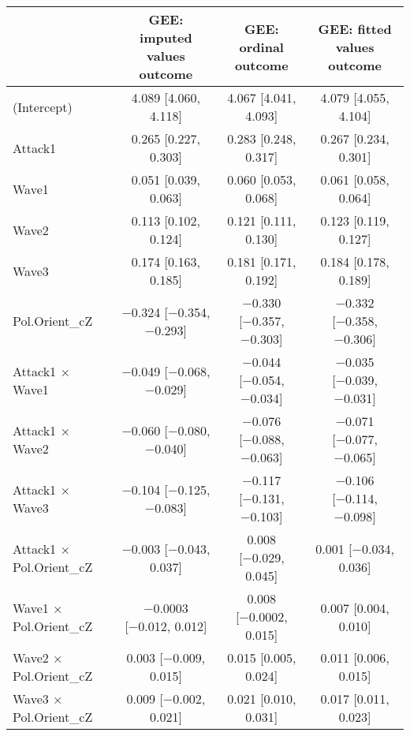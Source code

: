\begin{table}
\centering
\begin{tabular}[t]{lccc}
\toprule
  & GEE: imputed values outcome & GEE: ordinal outcome & GEE: fitted values outcome\\
\midrule
(Intercept) & \num{4.089} [\num{4.060}, \num{4.118}] & \num{4.067} [\num{4.041}, \num{4.093}] & \num{4.079} [\num{4.055}, \num{4.104}]\\
Attack1 & \num{0.265} [\num{0.227}, \num{0.303}] & \num{0.283} [\num{0.248}, \num{0.317}] & \num{0.267} [\num{0.234}, \num{0.301}]\\
Wave1 & \num{0.051} [\num{0.039}, \num{0.063}] & \num{0.060} [\num{0.053}, \num{0.068}] & \num{0.061} [\num{0.058}, \num{0.064}]\\
Wave2 & \num{0.113} [\num{0.102}, \num{0.124}] & \num{0.121} [\num{0.111}, \num{0.130}] & \num{0.123} [\num{0.119}, \num{0.127}]\\
Wave3 & \num{0.174} [\num{0.163}, \num{0.185}] & \num{0.181} [\num{0.171}, \num{0.192}] & \num{0.184} [\num{0.178}, \num{0.189}]\\
Pol.Orient\_cZ & \num{-0.324} [\num{-0.354}, \num{-0.293}] & \num{-0.330} [\num{-0.357}, \num{-0.303}] & \num{-0.332} [\num{-0.358}, \num{-0.306}]\\
Attack1 × Wave1 & \num{-0.049} [\num{-0.068}, \num{-0.029}] & \num{-0.044} [\num{-0.054}, \num{-0.034}] & \num{-0.035} [\num{-0.039}, \num{-0.031}]\\
Attack1 × Wave2 & \num{-0.060} [\num{-0.080}, \num{-0.040}] & \num{-0.076} [\num{-0.088}, \num{-0.063}] & \num{-0.071} [\num{-0.077}, \num{-0.065}]\\
Attack1 × Wave3 & \num{-0.104} [\num{-0.125}, \num{-0.083}] & \num{-0.117} [\num{-0.131}, \num{-0.103}] & \num{-0.106} [\num{-0.114}, \num{-0.098}]\\
Attack1 × Pol.Orient\_cZ & \num{-0.003} [\num{-0.043}, \num{0.037}] & \num{0.008} [\num{-0.029}, \num{0.045}] & \num{0.001} [\num{-0.034}, \num{0.036}]\\
Wave1 × Pol.Orient\_cZ & \num{-0.0003} [\num{-0.012}, \num{0.012}] & \num{0.008} [\num{-0.0002}, \num{0.015}] & \num{0.007} [\num{0.004}, \num{0.010}]\\
Wave2 × Pol.Orient\_cZ & \num{0.003} [\num{-0.009}, \num{0.015}] & \num{0.015} [\num{0.005}, \num{0.024}] & \num{0.011} [\num{0.006}, \num{0.015}]\\
Wave3 × Pol.Orient\_cZ & \num{0.009} [\num{-0.002}, \num{0.021}] & \num{0.021} [\num{0.010}, \num{0.031}] & \num{0.017} [\num{0.011}, \num{0.023}]\\

\end{tabular}
\end{table}
